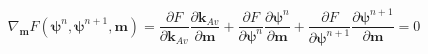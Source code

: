 \begin{equation}
\label{eq:richards-timestep-chain}
    \nabla_\mathbf{m}  F(\boldsymbol{\psi}^n,\boldsymbol{\psi}^{n+1},\mathbf{m})
    =
    \frac{\partial F}{\partial \mathbf{k}_{Av}}
    \frac{\partial\mathbf{k}_{Av}}{\partial\mathbf{m}}
    + \frac{\partial F}{\partial \boldsymbol{\psi}^n}\frac{\partial\boldsymbol{\psi}^n}{\partial\mathbf{m}}
    + \frac{\partial F}{\partial \boldsymbol{\psi}^{n+1}}\frac{\partial\boldsymbol{\psi}^{n+1}}{\partial\mathbf{m}}
    =0
\end{equation}
